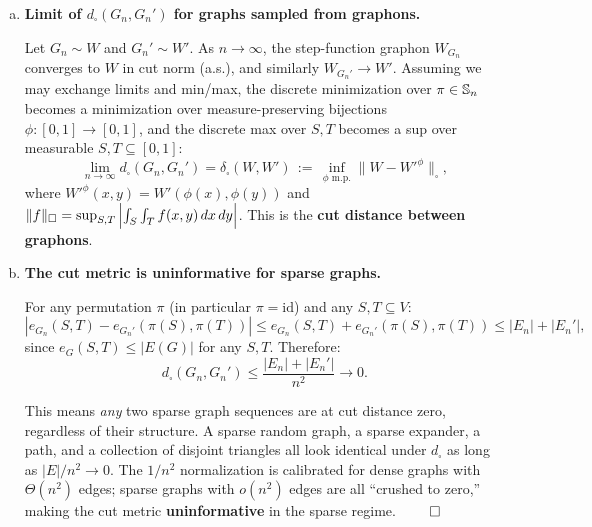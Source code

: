 \documentclass{article}
\begin{document}
\begin{tcolorbox}[colback=white, colframe=black!70, title=\textbf{Solution to Exercise 3}, breakable]
\begin{enumerate}[(a)]
Write $W = W_{G_n}$ and $U = W_{G_n'}^{\pi_n}$. By multilinearity, expanding $W = U + (W-U)$:
\[
\int W(x,y)W(y,z)W(x,z) - \int U(x,y)U(y,z)U(x,z)
\]
\[
= \int (W{-}U)(x,y)\,W(y,z)\,W(x,z) + \int U(x,y)\,(W{-}U)(y,z)\,W(x,z) + \int U(x,y)\,U(y,z)\,(W{-}U)(x,z).
\]
Each term has the form $\int (W-U)(s,t)\, h(s,t)\, ds\, dt$ after integrating out the third variable, where $\|h\|_\infty \leq 1$. By definition of the cut norm, such integrals are bounded by $\|W - U\|_\square$. Therefore:
\[
\boxed{|t(\triangle, G_n) - t(\triangle, G_n')| \leq 3\,\|W_{G_n} - W_{G_n'}^{\pi_n}\|_\square \leq 3\, d_\square(G_n, G_n') \to 0.}
\]
Hence $t(\triangle, G_n)$ and $t(\triangle, G_n')$ converge to the same limit. $\qed$

\item \textbf{Limit of $d_\square(G_n, G_n')$ for graphs sampled from graphons.}

Let $G_n \sim W$ and $G_n' \sim W'$. As $n \to \infty$, the step-function graphon $W_{G_n}$ converges to $W$ in cut norm (a.s.), and similarly $W_{G_n'} \to W'$. Assuming we may exchange limits and min/max, the discrete minimization over $\pi \in \S_n$ becomes a minimization over measure-preserving bijections $\phi: [0,1] \to [0,1]$, and the discrete max over $S, T$ becomes a sup over measurable $S, T \subseteq [0,1]$:
\[
\boxed{\lim_{n\to\infty} d_\square(G_n, G_n') = \delta_\square(W, W') \,:=\, \inf_{\phi \text{ m.p.}} \|W - W'^\phi\|_\square,}
\]
where $W'^\phi(x,y) = W'(\phi(x), \phi(y))$ and $\|f\|_\square = \sup_{S,T} \l|\int_S \int_T f(x,y)\, dx\, dy\r|$. This is the \textbf{cut distance between graphons}.

\item \textbf{The cut metric is uninformative for sparse graphs.}

For any permutation $\pi$ (in particular $\pi = \mathrm{id}$) and any $S, T \subseteq V$:
\[
|e_{G_n}(S,T) - e_{G_n'}(\pi(S), \pi(T))| \leq e_{G_n}(S,T) + e_{G_n'}(\pi(S), \pi(T)) \leq |E_n| + |E_n'|,
\]
since $e_G(S,T) \leq |E(G)|$ for any $S,T$. Therefore:
\[
\boxed{d_\square(G_n, G_n') \leq \frac{|E_n| + |E_n'|}{n^2} \to 0.}
\]

This means \emph{any} two sparse graph sequences are at cut distance zero, regardless of their structure. A sparse random graph, a sparse expander, a path, and a collection of disjoint triangles all look identical under $d_\square$ as long as $|E|/n^2 \to 0$. The $1/n^2$ normalization is calibrated for dense graphs with $\Theta(n^2)$ edges; sparse graphs with $o(n^2)$ edges are all ``crushed to zero,'' making the cut metric \textbf{uninformative} in the sparse regime. $\qed$


\end{enumerate}
\end{tcolorbox}
\end{document}
